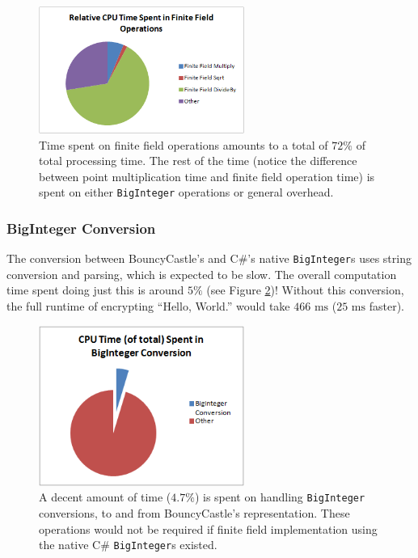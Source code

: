 \begin{figure}[htb!]
	\centering
	\includegraphics[width=0.6\textwidth]{performance/finite-field--relative-time}
	\caption{Time spent on finite field operations amounts to a total of \(72\%\) of total processing time. The rest of the time (notice the
		difference between point multiplication time and finite field operation time) is spent on either \texttt{BigInteger} operations or 
		general overhead.}
	\label{fig:finite-field-performance}
\end{figure}

\subsubsection{BigInteger Conversion}
\label{sec:performance_components_biginteger}

The conversion between BouncyCastle's and C\#'s native \texttt{BigInteger}s uses string conversion and parsing, which is expected to be slow.
The overall computation time spent doing just this is around \(5\%\) (see Figure \ref{fig:biginteger-performance})! Without this conversion,
the full runtime of encrypting ``Hello, World.'' would take \(466 \text{ ms}\) (\(25 \text{ ms}\) faster).

\begin{figure}[htb!]
	\centering
	\includegraphics[width=0.6\textwidth]{performance/biginteger-conversion--relative-time}
	\caption{A decent amount of time (\(4.7\%\)) is spent on handling \texttt{BigInteger} conversions, to and from BouncyCastle's representation.
		These operations would not be required if finite field implementation using the native C\# \texttt{BigInteger}s existed.}
	\label{fig:biginteger-performance}
\end{figure}